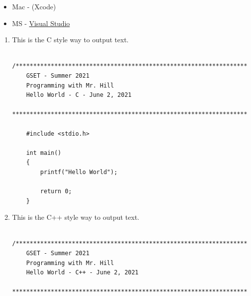 \documentclass[12pt]{article}
\begin{document}
\begin{description}[labelindent=1cm]
\begin{itemize}
	\item Mac - (Xcode)  
    
    \item MS - \href{https://visualstudio.microsoft.com/}{Visual Studio}
    
\end{itemize}	
\newpage

\item[\textbf{\underline{Part 2 - The Code:}}] \hfill \vspace{0mm}
\begin{enumerate}
    \item This is the C style way to output text.
	\begin{lstlisting}
	/********************************************************************
	GSET - Summer 2021 
	Programming with Mr. Hill 
	Hello World - C - June 2, 2021
	*********************************************************************/
	
	#include <stdio.h>
	
	int main()
	{
		printf("Hello World");
	
		return 0;
	}

	\end{lstlisting}

	
	\item This is the C++ style way to output text.
	\begin{lstlisting}
	/********************************************************************
	GSET - Summer 2021 
	Programming with Mr. Hill 
	Hello World - C++ - June 2, 2021
	*********************************************************************/
	

\end{lstlisting}
\end{enumerate}
\end{description}
\end{document}
